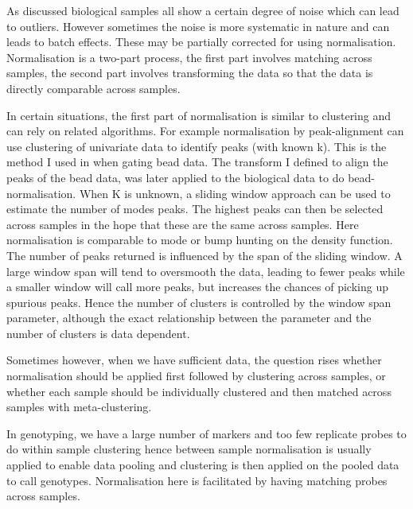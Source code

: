 As discussed biological samples all show a certain degree of noise which can lead to outliers.
However sometimes the noise is more systematic in nature and can leads to batch effects.
These may be partially corrected for using normalisation.
Normalisation is a two-part process, the first part involves matching across samples, the second part involves transforming the data so that the data is directly comparable across samples.

In certain situations,
the first part of normalisation is similar to clustering and can rely on related algorithms.
For example normalisation by peak-alignment can use clustering of univariate data to identify peaks (with known k).
This is the method I used in  when gating bead data.
The transform I defined to align the peaks of the bead data, was later applied to the biological data to do bead-normalisation.
When K is unknown, a sliding window approach can be used to estimate the number of modes peaks.
The highest peaks can then be selected across samples in the hope that these are the same across samples.
Here normalisation is comparable to mode or bump hunting on the density function.
The number of peaks returned is influenced by the span of the sliding window.
A large window span will tend to oversmooth the data, leading to fewer peaks while
a smaller window will call more peaks, but increases the chances of picking up spurious peaks.
Hence the number of clusters is controlled by the window span parameter, although the exact relationship between the parameter and the number of clusters is data dependent.


Sometimes however, when we have sufficient data, the question rises whether normalisation should be applied first followed by clustering across samples, or whether each sample should be individually clustered  and then matched across samples with meta-clustering.

In genotyping, we have a large number of markers and too few replicate probes to do within sample clustering hence between sample normalisation is usually applied to enable data pooling and clustering is then applied on the pooled data to call genotypes.
Normalisation here is facilitated by having matching probes across samples.

